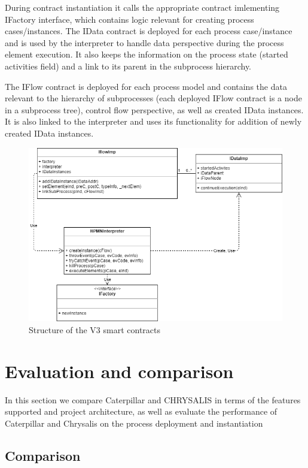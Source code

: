 During contract instantiation it calls the appropriate contract imlementing IFactory interface, which contains logic relevant for creating process cases/instances. The IData contract is deployed for each process case/instance and is used by the interpreter to handle data perspective during the process element execution. It also keeps the information on the process state (started activities field) and a link to its parent in the subprocess hierarchy.

The IFlow contract is deployed for each process model and contains the data relevant to the hierarchy of subprocesses (each deployed IFlow contract is a node in a subprocess tree), control flow perspective, as well as created IData instances. It is also linked to the interpreter and uses its functionality for addition of newly created IData instances.

\begin{figure}[hbt]
	\includegraphics[width=\textwidth]{gfx/caterpillar-interpretation-contracts}
	\caption{Structure of the V3 smart contracts}
	\label{fig:caterpillar:v3:contacts}
\end{figure}

\section{Evaluation and comparison}
\label{sec:caterpillar:eval}

In this section we compare Caterpillar and CHRYSALIS in terms of the features supported and project architecture, as well as evaluate the performance of Caterpillar and Chrysalis on the process deployment and instantiation

\subsection{Comparison}
\label{sec:caterpillar:eval:comp}

